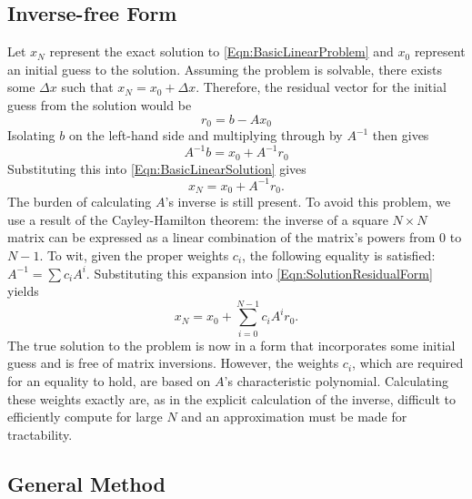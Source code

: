 \documentclass[Prelim,12pt]{WisconsinThesis}
\newcommand{\by}    {\!\times\!}
\begin{document}
\subsection{Inverse-free Form}
Let $x_N$ represent the exact solution to \cref{Eqn:BasicLinearProblem} and $x_0$ represent an initial guess to the solution.
Assuming the problem is solvable, there exists some $\Delta{x}$ such that $x_N = x_0 + \Delta{x}$.
Therefore, the residual vector for the initial guess from the solution would be
\begin{equation}
    r_0 = b - A x_0
\end{equation}
Isolating $b$ on the left-hand side and multiplying through by $A^{-1}$ then gives
\begin{equation}
    A^{-1} b = x_0 + A^{-1} r_0
\end{equation}
Substituting this into \cref{Eqn:BasicLinearSolution} gives
\begin{equation}
    x_N = x_0 + A^{-1} r_0.
    \label{Eqn:SolutionResidualForm}
\end{equation}
The burden of calculating $A$'s inverse is still present.
To avoid this problem, we use a result of the Cayley-Hamilton theorem: the inverse of a square $N \by N$ matrix can be expressed as a linear combination of the matrix's powers from $0$ to $N-1$.
To wit, given the proper weights $c_i$, the following equality is satisfied: $A^{-1} = \sum c_i A^i$.
Substituting this expansion into \cref{Eqn:SolutionResidualForm} yields
\begin{equation}
    x_N = x_0 + \sum_{i = 0}^{N-1} c_i A^i r_0.
    \label{Eqn:ExactKrylovSolution}
\end{equation}
The true solution to the problem is now in a form that incorporates some initial guess and is free of matrix inversions.
However, the weights $c_i$, which are required for an equality to hold, are based on $A$'s characteristic polynomial.
Calculating these weights exactly are, as in the explicit calculation of the inverse, difficult to efficiently compute for large $N$ and an approximation must be made for tractability.


\subsection{General Method}
\end{document}

